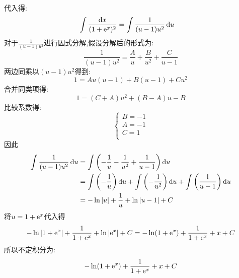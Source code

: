 \begin{questions}
\begin{solution}
		代入得:
		\begin{align*}
			\int\frac{\mathop{}\!\mathrm{d}x}{(1+\mathrm{e}^x)^2} & = \int\frac{1}{(u-1)u^2}\mathop{}\!\mathrm{d}u
		\end{align*}
		对于$\frac{1}{(u-1)u^2}$进行因式分解,假设分解后的形式为:
		\begin{equation*}
			\frac{1}{(u-1)u^2} = \frac{A}{u} + \frac{B}{u^2} + \frac{C}{u-1}
		\end{equation*}
		两边同乘以$(u-1)u^2$得到:
		\begin{equation*}
			1 = Au(u-1) + B(u-1) + Cu^2
		\end{equation*}
		合并同类项得:
		\begin{equation*}
			1 = (C+A)u^2 + (B-A)u - B
		\end{equation*}
		比较系数得:
		\begin{equation*}
			\begin{cases}
				B = -1 \\
				A = -1 \\
				C = 1  \\
			\end{cases}
		\end{equation*}
		因此
		\begin{align*}
			\int\frac{1}{(u-1)u^2}\mathop{}\!\mathrm{d}u
			 & = \int\left(-\frac{1}{u} - \frac{1}{u^2} + \frac{1}{u-1}\right)\mathop{}\!\mathrm{d}u \\
			 & = \int\left(-\frac1u\right)\mathop{}\!\mathrm{d}u +
			\int\left(-\frac1{u^2}\right)\mathop{}\!\mathrm{d}u +
			\int\left(\frac1{u-1}\right)\mathop{}\!\mathrm{d}u                                       \\
			 & = -\ln|u| + \frac1u + \ln|u-1| + C
		\end{align*}
		将$u=1+\mathrm{e}^x$代入得
		\begin{equation*}
			-\ln|1+\mathrm{e}^x| + \frac{1}{1+\mathrm{e}^x} + \ln|\mathrm{e}^x| + C
			= -\ln(1+\mathrm{e}^x) + \frac{1}{1+\mathrm{e}^x} + x + C
		\end{equation*}
		所以不定积分为:
		{
		\boldmath
		\color{blue}
		\begin{equation*}
			-\ln(1+\mathrm{e}^x) + \frac{1}{1+\mathrm{e}^x} + x + C
		\end{equation*}
		}
	\end{solution}
\end{questions}
